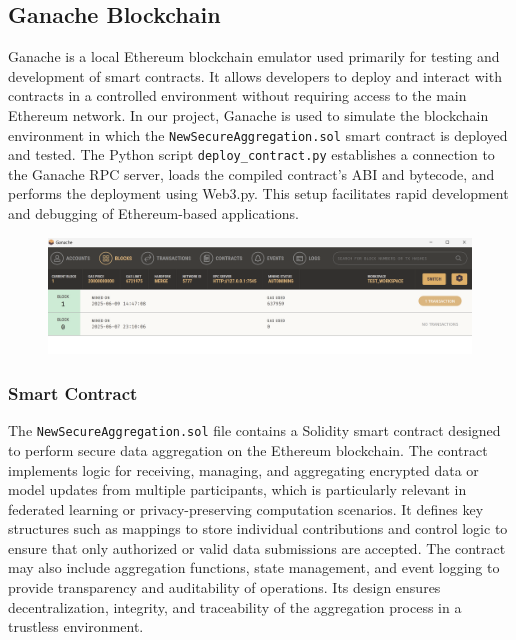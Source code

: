 \documentclass[10pt]{article}
\begin{document}
\subsection{Ganache Blockchain}
Ganache is a local Ethereum blockchain emulator used primarily for testing and development of smart contracts. It allows developers to deploy and interact with contracts in a controlled environment without requiring access to the main Ethereum network. In our project, Ganache is used to simulate the blockchain environment in which the \texttt{NewSecureAggregation.sol} smart contract is deployed and tested. The Python script \texttt{deploy\_contract.py} establishes a connection to the Ganache RPC server, loads the compiled contract's ABI and bytecode, and performs the deployment using Web3.py. This setup facilitates rapid development and debugging of Ethereum-based applications.
\begin{figure}[H]
	\centering
	\includegraphics[height = 0.20\textheight]{img/QFL_code/Ganache.png}
\end{figure}
\subsubsection*{Smart Contract}
The \texttt{NewSecureAggregation.sol} file contains a Solidity smart contract designed to perform secure data aggregation on the Ethereum blockchain. The contract implements logic for receiving, managing, and aggregating encrypted data or model updates from multiple participants, which is particularly relevant in federated learning or privacy-preserving computation scenarios. It defines key structures such as mappings to store individual contributions and control logic to ensure that only authorized or valid data submissions are accepted. The contract may also include aggregation functions, state management, and event logging to provide transparency and auditability of operations. Its design ensures decentralization, integrity, and traceability of the aggregation process in a trustless environment.
\end{document}
